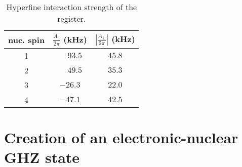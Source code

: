 \documentclass[aps,floatfix,footinbib,superscriptaddress]{revtex4-1}
\begin{document}
\begin{table}[H]
\caption{Hyperfine interaction strength of the register.}
\begin{center}
\begin{tabular}{ c c c }
  \hline
  \textbf{nuc. spin} & \textbf{$\frac{A_\parallel}{2\pi}$ (kHz)} & \textbf{$\left| \frac{A_\perp}{2\pi}\right|$ (kHz)} \\ 
  \hline
  1 & $\phantom{-}93.5$ & $45.8$ \\
  2 & $\phantom{-}49.5$ & $35.3$ \\
  3 & $-26.3$ &$22.0$\\
  4 & $-47.1$ & $42.5$\\
  \hline
\end{tabular}
\end{center}
\label{tab:HF}
\end{table}

\section{Creation of an electronic-nuclear GHZ state}\label{sec.GHZ}
\end{document}
